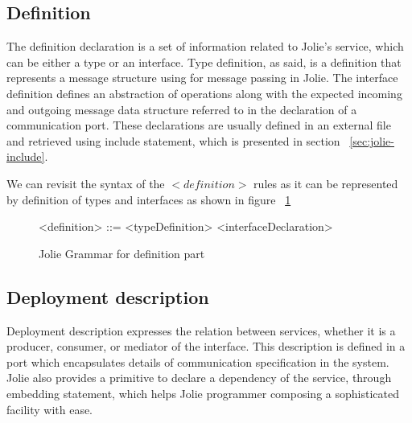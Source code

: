 \FloatBarrier

\subsection{Definition}
\label{sec:jolie-def}

The definition declaration is a set of information related to Jolie's service, which can be either a type or an interface. Type definition, as said, is a definition that represents a message structure using for message passing in Jolie. The interface definition defines an abstraction of operations along with the expected incoming and outgoing message data structure referred to in the declaration of a communication port. 
These declarations are usually defined in an external file and retrieved using include statement, which is presented in section ~\ref{sec:jolie-include}.





% 

We can revisit the syntax of the \(<definition>\) rules as it can be represented by definition of types and interfaces as shown in figure ~\ref{fig:jolie-definition}

\begin{figure}[h]
    \begin{framed}
        \begin{grammar}
            <definition> ::= <typeDefinition>
            \alt <interfaceDeclaration>
        \end{grammar}
    \end{framed}
    \caption{Jolie Grammar for definition part}
    \label{fig:jolie-definition}
\end{figure}

\subsection{Deployment description}

Deployment description expresses the relation between services, whether it is a producer, consumer, or mediator of the interface.
This description is defined in a port which encapsulates details of communication specification in the system.
Jolie also provides a primitive to declare a dependency of the service, through embedding statement, which helps Jolie programmer composing a sophisticated facility with ease.

